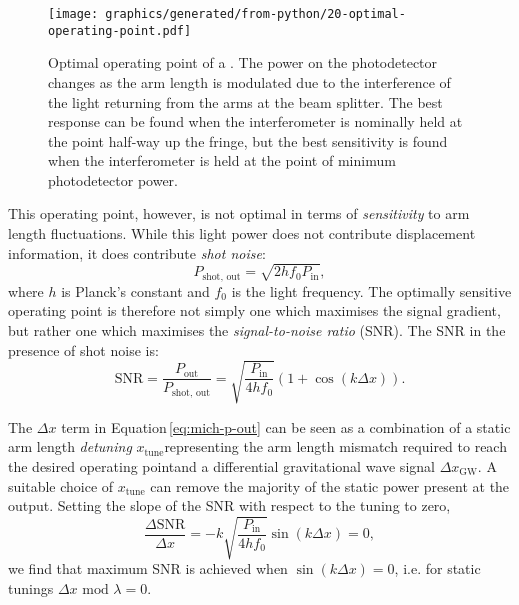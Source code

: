 \begin{figure}
  \centering
  \texttt{[image: graphics/generated/from-python/20-optimal-operating-point.pdf]}
  \caption[Optimal operating point of a \MI{}]{\label{fig:optimal-operating-point}Optimal operating point of a \MI{}. The power on the photodetector changes as the arm length is modulated due to the interference of the light returning from the arms at the beam splitter. The best response can be found when the interferometer is nominally held at the point half-way up the fringe, but the best sensitivity is found when the interferometer is held at the point of minimum photodetector power.}
\end{figure}

This operating point, however, is not optimal in terms of \emph{sensitivity} to arm length fluctuations. While this light power does not contribute displacement information, it does contribute \emph{shot noise}:
\begin{equation}
  P_{\text{shot, out}} = \sqrt{2 h f_0 P_{\text{in}}},
\end{equation}
where $h$ is Planck's constant and $f_0$ is the light frequency. The optimally sensitive operating point is therefore not simply one which maximises the signal gradient, but rather one which maximises the \emph{signal-to-noise ratio} (\gls{SNR}). The \gls{SNR} in the presence of shot noise is:
\begin{equation}
  \text{SNR} = \frac{P_{\text{out}}}{P_{\text{shot, out}}} = \sqrt{\frac{P_{\text{in}}}{4 h f_0}} \left( 1 + \cos \left(k \Delta x \right) \right).
\end{equation}

The $\Delta x$ term in Equation\,\ref{eq:mich-p-out} can be seen as a combination of a static arm length \emph{detuning} $x_{\text{tune}}$\textemdash representing the arm length mismatch required to reach the desired operating point\textemdash and a differential gravitational wave signal $\Delta x_{\text{GW}}$. A suitable choice of $x_{\text{tune}}$ can remove the majority of the static power present at the output. Setting the slope of the \gls{SNR} with respect to the tuning to zero,
\begin{equation}
  \frac{\Delta \text{SNR}}{\Delta x} = -k \sqrt{\frac{P_{\text{in}}}{4 h f_0}} \sin \left(k \Delta x\right) = 0,
\end{equation}
we find that maximum \gls{SNR} is achieved when $\sin \left( k \Delta x \right) = 0$, i.e. for static tunings $\Delta x \text{ mod } \lambda = 0$.

